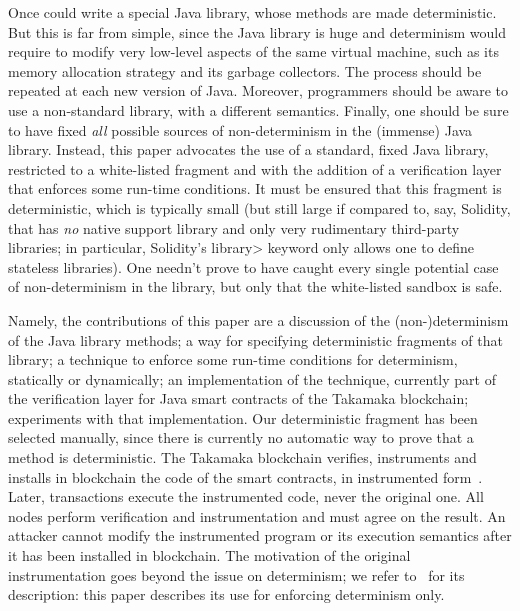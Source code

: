 Once could write a special Java library, whose
methods are made deterministic. But this is far from simple, since the Java library is huge
and determinism would require to modify very low-level aspects of the same virtual machine, such as
its memory allocation strategy and its garbage collectors.
The process should be repeated at each new version of Java.
Moreover, programmers should be aware to use a non-standard library, with a different semantics.
Finally, one should be sure to have fixed \emph{all} possible sources of non-determinism in the
(immense) Java library.
Instead, this paper advocates the use of a standard, fixed Java library, restricted to a white-listed
fragment and with the addition of a verification layer that enforces some run-time conditions.
It must be ensured that this fragment is deterministic, which is typically small (but still
large if compared to, say, Solidity, that has \emph{no} native support library and only very
rudimentary third-party libraries; in particular, Solidity's \<library> keyword
only allows one to define stateless libraries). One needn't prove
to have caught every single potential case of non-determinism in the library, but only that
the white-listed sandbox is safe.

Namely, the contributions of this paper are a discussion of the (non-)determi\-nism
of the Java library methods; a way for specifying deterministic fragments
of that library; a technique to enforce
some run-time conditions for determinism, statically or dynamically;
an implementation of the technique, currently part of the verification
layer for Java smart contracts of the Takamaka blockchain;
experiments with that implementation.
Our deterministic fragment has been selected manually, since there is
currently no automatic way to prove that a method is deterministic.
The Takamaka blockchain verifies, instruments and installs in blockchain the code of the smart
contracts, in instrumented form~\cite{Spoto19}. Later, transactions execute the
instrumented code, never the original one. All nodes perform verification and instrumentation
and must agree on the result. An attacker cannot modify the instrumented program
or its execution semantics after it has been installed in blockchain.
The motivation of the original instrumentation goes beyond the issue on determinism;
we refer to~\cite{Spoto19} for its description: this paper describes its use for enforcing
determinism only.

